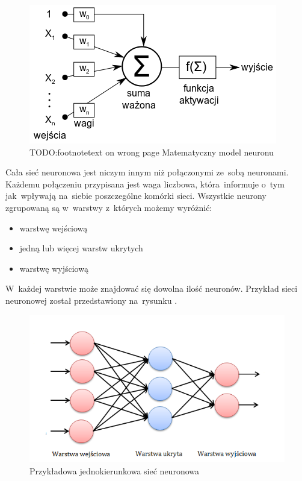 \begin{figure}[ht!]
\centering
\includegraphics{res/neuron.png}
\caption[Caption for LOF]{TODO:footnotetext on wrong page Matematyczny model neuronu\label{neuron}\footnotemark}
\end{figure} 


Cała sieć neuronowa jest niczym innym niż połączonymi ze~sobą neuronami. Każdemu połączeniu przypisana jest waga liczbowa, która~informuje o~tym jak~wpływają na~siebie poszczególne komórki sieci. Wszystkie neurony zgrupowaną są w~warstwy z~których możemy wyróżnić:
\begin{itemize}
\item warstwę wejściową
\item jedną lub więcej warstw ukrytych
\item warstwę wyjściową
\end{itemize}

W~każdej warstwie może znajdować się dowolna ilość neuronów. Przykład sieci neuronowej został przedstawiony na~rysunku \label{net}.

\begin{figure}[ht!]
\centering
\includegraphics{res/exampleNet.png}
\caption[Caption for LOF]{Przykładowa jednokierunkowa sieć neuronowa\label{net}\footnotemark} 
\end{figure}

